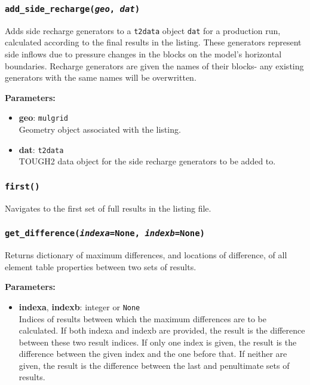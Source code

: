 \subsubsection{\texttt{add\_side\_recharge(\emph{geo}, \emph{dat})}}

Adds side recharge generators to a \texttt{t2data} object \texttt{dat} for a production run, calculated according to the final results in the listing.  These generators represent side inflows due to pressure changes in the blocks on the model's horizontal boundaries.  Recharge generators are given the names of their blocks- any existing generators with the same names will be overwritten.

\textbf{Parameters:}
\begin{itemize}
\item \textbf{geo}: \texttt{mulgrid}\\
  Geometry object associated with the listing.
\item \textbf{dat}: \texttt{t2data}\\
  TOUGH2 data object for the side recharge generators to be added to.
\end{itemize}

\subsubsection{\texttt{first()}}

Navigates to the first set of full results in the listing file.

\subsubsection{\texttt{get\_difference(\emph{indexa}=None, \emph{indexb}=None)}}

Returns dictionary of maximum differences, and locations of difference, of all element table properties between two sets of results.

\textbf{Parameters:}
\begin{itemize}
\item \textbf{indexa}, \textbf{indexb}: integer or \texttt{None}\\
  Indices of results between which the maximum differences are to be calculated.  If both indexa and indexb are provided, the result is the difference between these two result indices.  If only one index is given, the result is the difference between the given index and the one before that.  If neither are given, the result is the difference between the last and penultimate sets of results.
\end{itemize}

